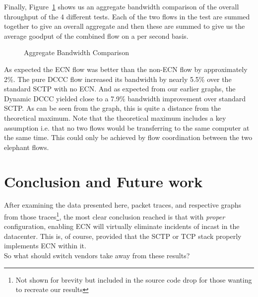 \documentclass[12pt]{article}
\begin{document}
Finally, Figure~\ref{fig:aggBw}  shows us an aggregate bandwidth comparison of the 
overall throughput of the 4 different tests. Each of the two flows in the test are summed
together to give an overall aggregate and then these are summed to give us the average
goodput of the combined flow on a per second basis. 

\begin{figure}[h]
\centering
{}
\caption{Aggregate Bandwidth Comparison}
\label{fig:aggBw}
\end{figure}

As expected the ECN flow was better than the non-ECN flow by approximately 2\%. The
pure DCCC flow increased its bandwidth by nearly 5.5\% over the standard SCTP with no ECN.
And as expected from our earlier graphs, the Dynamic DCCC yielded close to a 7.9\% bandwidth
improvement over standard SCTP. As can be seen from the graph, this is quite a distance from the
theoretical maximum. Note that the theoretical maximum includes a key assumption i.e. that 
no two flows would be transferring to the same computer at the same time. This could only
be achieved by flow coordination between the two elephant flows.

\section{Conclusion and Future work}

After examining the data presented here, packet traces, and respective
graphs from those traces\footnote{Not shown for brevity but included in the source
code drop for those wanting to recreate our results}, the most clear conclusion reached is that 
with \emph{proper} configuration, enabling ECN will virtually eliminate incidents of
incast in the datacenter. This is, of course, provided that the SCTP or
TCP stack properly implements ECN within it. 
\\

So what should switch vendors take away from these results?
\end{document}
